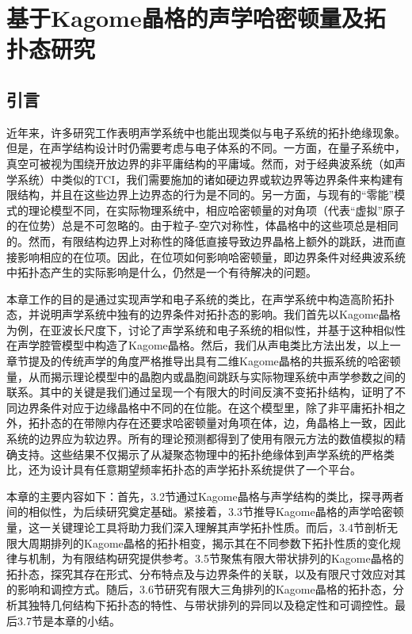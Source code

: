 \chapter{基于Kagome晶格的声学哈密顿量及拓扑态研究}

\section{引言}

近年来，许多研究工作表明声学系统中也能出现类似与电子系统的拓扑绝缘现象。但是，在声学结构设计时仍需要考虑与电子体系的不同。一方面，在量子系统中，真空可被视为围绕开放边界的非平庸结构的平庸域。然而，对于经典波系统（如声学系统）中类似的TCI，我们需要施加的诸如硬边界或软边界等边界条件来构建有限结构，并且在这些边界上边界态的行为是不同的。另一方面，与现有的“零能”模式的理论模型不同，在实际物理系统中，相应哈密顿量的对角项（代表“虚拟”原子的在位势）总是不可忽略的。由于粒子-空穴对称性，体晶格中的这些项总是相同的。然而，有限结构边界上对称性的降低直接导致边界晶格上额外的跳跃，进而直接影响相应的在位项。因此，在位项如何影响哈密顿量，即边界条件对经典波系统中拓扑态产生的实际影响是什么，仍然是一个有待解决的问题。

本章工作的目的是通过实现声学和电子系统的类比，在声学系统中构造高阶拓扑态，并说明声学系统中独有的边界条件对拓扑态的影响。我们首先以Kagome晶格为例，在亚波长尺度下，讨论了声学系统和电子系统的相似性，并基于这种相似性在声学腔管模型中构造了Kagome晶格。然后，我们从声电类比方法出发，以上一章节提及的传统声学的角度严格推导出具有二维Kagome晶格的共振系统的哈密顿量，从而揭示理论模型中的晶胞内或晶胞间跳跃与实际物理系统中声学参数之间的联系。其中的关键是我们通过呈现一个有限大的时间反演不变拓扑结构，证明了不同边界条件对应于边缘晶格中不同的在位能。在这个模型里，除了非平庸拓扑相之外，拓扑态的在带隙内存在还要求哈密顿量对角项在体，边，角晶格上一致，因此系统的边界应为软边界。所有的理论预测都得到了使用有限元方法的数值模拟的精确支持。这些结果不仅揭示了从凝聚态物理中的拓扑绝缘体到声学系统的严格类比，还为设计具有任意期望频率拓扑态的声学拓扑系统提供了一个平台。

本章的主要内容如下：首先，3.2节通过Kagome晶格与声学结构的类比，探寻两者间的相似性，为后续研究奠定基础。紧接着，3.3节推导Kagome晶格的声学哈密顿量，这一关键理论工具将助力我们深入理解其声学拓扑性质。而后，3.4节剖析无限大周期排列的Kagome晶格的拓扑相变，揭示其在不同参数下拓扑性质的变化规律与机制，为有限结构研究提供参考。3.5节聚焦有限大带状排列的Kagome晶格的拓扑态，探究其存在形式、分布特点及与边界条件的关联，以及有限尺寸效应对其的影响和调控方式。随后，3.6节研究有限大三角排列的Kagome晶格的拓扑态，分析其独特几何结构下拓扑态的特性、与带状排列的异同以及稳定性和可调控性。最后3.7节是本章的小结。


